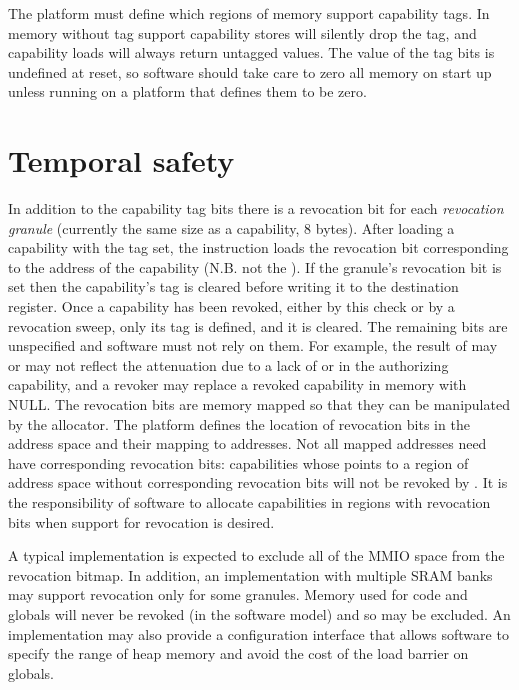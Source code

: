The platform must define which regions of memory support capability tags.
In memory without tag support capability stores will silently drop the tag, and capability loads will always return untagged values.
The value of the tag bits is undefined at reset, so software should take care to zero all memory on start up unless running on a platform that defines them to be zero.

\section{Temporal safety}
\label{sec:temporal}

In addition to the capability tag bits there is a revocation bit for each \emph{revocation granule} (currently the same size as a capability, 8 bytes).
After loading a capability with the tag set, the  instruction loads the revocation bit corresponding to the \cbase{} address of the capability (N.B. not the \caddress{}).
If the granule's revocation bit is set then the capability's tag is cleared before writing it to the destination register.
Once a capability has been revoked, either by this check or by a revocation sweep, only its tag is defined, and it is cleared.
The remaining bits are unspecified and software must not rely on them.
For example, the result of  may or may not reflect the attenuation due to a lack of \cappermILG or \cappermLM in the authorizing capability, and a revoker may replace a revoked capability in memory with NULL.
The revocation bits are memory mapped so that they can be manipulated by the allocator.
The platform defines the location of revocation bits in the address space and their mapping to addresses.
Not all mapped addresses need have corresponding revocation bits:
capabilities whose \cbase{} points to a region of address space without corresponding revocation bits will not be revoked by .
It is the responsibility of software to allocate capabilities in regions with revocation bits when support for revocation is desired.

A typical implementation is expected to exclude all of the MMIO space from the revocation bitmap.
In addition, an implementation with multiple SRAM banks may support revocation only for some granules.
Memory used for code and globals will never be revoked (in the software model) and so may be excluded.
An implementation may also provide a configuration interface that allows software to specify the range of heap memory and avoid the cost of the load barrier on globals.

